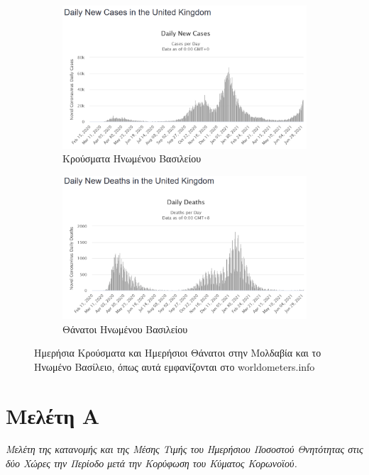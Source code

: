 \documentclass{article}
\begin{document}
\begin{figure}[H]
\begin{subfigure}[b]{0.475\textwidth}
        \centering 
        \includegraphics[width=\textwidth]{media/3/UK_cases.png}
        \caption{Κρούσματα Ηνωμένου Βασιλείου}  
    \end{subfigure}
    \hfill
    \begin{subfigure}[b]{0.475\textwidth}   
        \centering 
        \includegraphics[width=\textwidth]{media/3/UK_deaths.png}
        \caption{Θάνατοι Ηνωμένου Βασιλείου}
    \end{subfigure}
    \caption{Ημερήσια Κρούσματα και Ημερήσιοι Θάνατοι στην Μολδαβία και το Ηνωμένο Βασίλειο, όπως αυτά εμφανίζονται στο \foreignlanguage{english}{worldometers.info}}
    \label{all}
\end{figure}
\vfill
\newpage

\section{Μελέτη Α}

\emph{Μελέτη της κατανομής και της Μέσης Τιμής του Ημερήσιου Ποσοστού Θνητότητας στις δύο Χώρες την Περίοδο μετά την Κορύφωση του Κύματος Κορωνοϊού.} 
\end{document}
